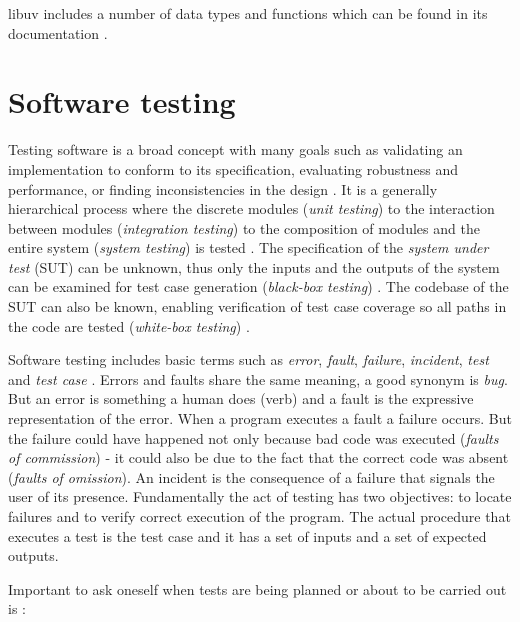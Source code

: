 libuv includes a number of data types and functions which can be found in its
documentation \cite{libuv-docs}.

\section{Software testing}

Testing software is a broad concept with many goals such as validating an
implementation to conform to its specification, evaluating robustness and
performance, or finding inconsistencies in the design
\cite{bertolino2007software}. It is a generally hierarchical process where the
discrete modules (\textit{unit testing}) to the interaction between modules
(\textit{integration testing}) to the composition of modules and the entire
system (\textit{system testing}) is tested \cite{raymond1998automatic}. The
specification of the \textit{system under test} (SUT) can be unknown, thus only
the inputs and the outputs of the system can be examined for test case
generation (\textit{black-box testing}) \cite{jorgensen2016software}. The
codebase of the SUT can also be known, enabling verification of test case
coverage so all paths in the code are tested (\textit{white-box testing})
\cite{jorgensen2016software}.

Software testing includes basic terms such as \textit{error}, \textit{fault},
\textit{failure}, \textit{incident}, \textit{test} and \textit{test case}
\cite{radatz1990ieee}. Errors and faults share the same meaning, a good synonym
is \textit{bug}. But an error is something a human does (verb) and a fault is
the expressive representation of the error. When a program executes a fault a
failure occurs. But the failure could have happened not only because bad code
was executed (\textit{faults of commission}) - it could also be due to the fact
that the correct code was absent (\textit{faults of omission}). An incident is
the consequence of a failure that signals the user of its presence.
Fundamentally the act of testing has two objectives: to locate failures and to
verify correct execution of the program. The actual procedure that executes a
test is the test case and it has a set of inputs and a set of expected outputs.
\cite{jorgensen2016software}

Important to ask oneself when tests are being planned or about to be carried
out is \cite{bertolino2007software}:

